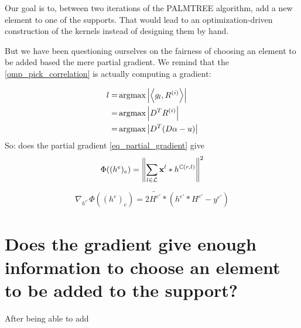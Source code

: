 Our goal is to, between two iterations of the PALMTREE algorithm, add a new element to one of the supports. That would lead to an optimization-driven construction of the kernels instead of designing them by hand.

But we have been questioning ourselves on the fairness of choosing an element to be added based the mere partial gradient. We remind that the \ref{omp_pick_correlation} is actually computing a gradient:

\begin{align*}
l =& \operatorname*{\arg\!\max} \left|\left< g_l,R^{(i)} \right>\right| \\
=& \operatorname*{\arg\!\max} \left| D^TR^{(i)}\right| \\
=& \operatorname*{\arg\!\max} \left| D^T(D\alpha - u)\right| \\
\end{align*}
So: does the partial gradient \ref{eq_partial_gradient} give 
\begin{align*}
\Phi((h^e)_e) = \left\| \sum_{l\in\mathcal L} \mathbf x^l * h^{\mathbb C(r,l)} \right\|^2
\end{align*}
\begin{align*} 
\nabla_{h^{e'}}\Phi((h^e)_e) = 2 \widetilde{H^{e'}} * (h^{e'}*H^{e'}-y^{e'})
\end{align*} \label{eq_partial_gradient}


\section{Does the gradient give enough information to choose an element to be added to the support?}

After being able to add
